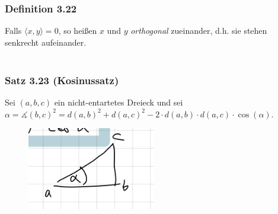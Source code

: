 \documentclass{article}
\begin{document}
\subsubsection*{Definition 3.22}
Falls $\langle x,y \rangle = 0$, so heißen $x$ und $y$ \textit{orthogonal} zueinander, d.h. sie stehen senkrecht aufeinander. \\
\\
\subsubsection*{Satz 3.23 (Kosinussatz)}
Sei $(a,b,c)$ ein nicht-entartetes Dreieck und sei $\alpha = \measuredangle (b,c)^2 = d(a,b)^2 + d(a,c)^2 - 2 \cdot d(a,b) \cdot d(a,c) \cdot \cos(\alpha)$. \\
\begin{figure}[h]
    \centering
    \includegraphics[width=0.5\textwidth]{Images/3.23.jpeg}
    \caption{}
\end{figure}  
\\
\end{document}
